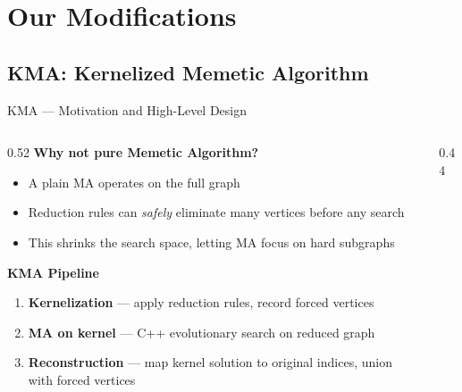 \documentclass[aspectratio=169,10pt]{beamer}
\newcommand{\highlight}[1]{\textcolor{midblue}{\textbf{#1}}}
\begin{document}
\section{Our Modifications}
\subsection{KMA: Kernelized Memetic Algorithm}

\begin{frame}{KMA — Motivation and High-Level Design}
  \begin{columns}[T]
    \begin{column}{0.52\textwidth}
      \textbf{Why not pure Memetic Algorithm?}
      \begin{itemize}
        \item A plain MA \cite{lust2010} operates on the full graph
        \item Reduction rules can \emph{safely} eliminate many vertices
          before any search \cite{thomasse2010}
        \item This shrinks the search space, letting MA focus on hard subgraphs
      \end{itemize}
      \vspace{6pt}
      \textbf{KMA Pipeline}
      \begin{enumerate}\setlength\itemsep{2pt}
        \item \highlight{Kernelization} — apply reduction rules, record forced vertices
        \item \highlight{MA on kernel} — C++ evolutionary search on reduced graph
        \item \highlight{Reconstruction} — map kernel solution to original indices,
          union with forced vertices
      \end{enumerate}
    \end{column}
    \begin{column}{0.44\textwidth}
\end{column}
\end{columns}
\end{frame}
\end{document}
